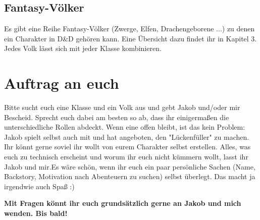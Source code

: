 \documentclass[a4paper]{article}
\begin{document}
\subsection*{Fantasy-Völker}
Es gibt eine Reihe Fantasy-Völker (Zwerge, Elfen, Drachengeborene ...) zu
denen ein Charakter in D\&D gehören kann. Eine Übersicht dazu findet ihr in
Kapitel 3. Jedes Volk lässt sich mit jeder Klasse kombinieren.

\section*{Auftrag an euch}
Bitte sucht euch eine Klasse und ein Volk aus und gebt Jakob und/oder mir Bescheid. Sprecht
euch dabei am besten so ab, dass ihr einigermaßen die unterschiedliche Rollen
abdeckt. Wenn eine offen bleibt, ist das kein Problem: Jakob spielt selbst
auch mit und hat angeboten, den "Lückenfüller" zu machen. Ihr könnt gerne
soviel ihr wollt von eurem Charakter selbst erstellen. Alles, was euch zu
technisch erscheint und worum ihr euch nicht kümmern wollt, lasst ihr Jakob
und mir.Es wäre schön, wenn ihr euch ein paar persönliche Sachen (Name,
Backstory, Motivation nach Abenteuern zu suchen) selbst überlegt. Das macht ja
irgendwie auch Spaß :)

\textbf{Mit Fragen könnt ihr euch grundsätzlich gerne an Jakob und mich
wenden. Bis bald!}
\end{document}
